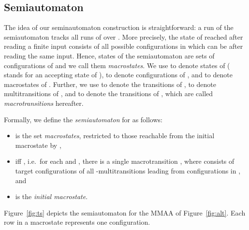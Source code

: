 \documentclass{llncs}
\begin{document}
\subsection{Semiautomaton }
\label{sec:ts}
The idea of our seminautomaton construction is straightforward: a run
 of the semiautomaton  tracks all runs of  over .
More precisely, the state of  reached after reading a finite input
consists of all possible configurations in which  can be after reading
the same input.  Hence, states of the semiautomaton are sets of
configurations of  and we call them \emph{macrostates}.  We use
 to denote states of  ( stands for an accepting
state of ),  to denote configurations of , and
 to denote macro\-states of .  Further, we use
 to denote the transitions of ,  to
denote multitransitions of , and  to denote the
transitions of , which are called \emph{macrotransitions} hereafter.


Formally, we define the \emph{semiautomaton } 
for  as follows:
\begin{itemize}
\item  is the set \emph{macrostates}, restricted to
  those reachable from the initial macrostate  by ,
\item  iff , i.e.~for each  and
  , there is a single macrotransition
  , where  consists of target
  configurations of all -multitransitions leading from
  configurations in , and
\item  is the \emph{initial macrostate}.
\end{itemize}




Figure~\ref{fig:ts} depicts the semiautomaton  for the MMAA of
Figure~\ref{fig:alt}. Each row in a macrostate represents one configuration.























		  


    
\end{document}

